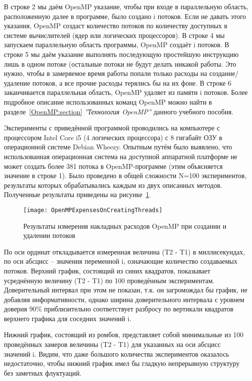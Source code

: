 \inputminted{c++}{listings/OpenMPExampleTimeMeasurement.cpp}

В строке 2 мы даём OpenMP указание, чтобы при входе в параллельную область, расположенную далее в программе, было создано i потоков. Если не давать этого указания, OpenMP создаст количество потоков по количеству доступных в системе вычислителей (ядер или логических процессоров). В строке 4 мы запускаем параллельную область программы, OpenMP создаёт i потоков. В строке 5 мы даём указание выполнять последующую простейшую инструкцию лишь в одном потоке (остальные потоки не будут делать никакой работы. Это нужно, чтобы в замеряемое время работы попали только расходы на создание/удаление потоков, а все прочие расходы терялись бы на их фоне. В строке 6 заканчивается параллельная область, OpenMP удаляет из памяти i потоков. Более подробное описание использованных команд OpenMP можно найти в разделе~\ref{OpenMP:section} \textit{''Технология OpenMP''} данного учебного  пособия.

Эксперименты с приведённой программой проводились на компьютере с процессором Intel Core i5 (4 логических процессора) с 8 гигабайт ОЗУ в операционной системе Debian Wheezy. Опытным путём было выявлено, что использованная операционная система на доступной аппаратной платформе не может создать более 381 потока в OpenMP-программе (этим объясняется значение в строке 1). Было проведено в общей сложности N=100 экспериментов, результаты которых обрабатывались каждым из двух описанных методов. Полученные результаты приведены на рисунке~\ref{OpenMPExpensesOnCreatingThreads:image}.

\begin{figure}[H]
    \texttt{[image: OpenMPExpensesOnCreatingThreads]}
    \caption{Результаты измерения накладных расходов OpenMP при создании и удалении потоков}
    \label{OpenMPExpensesOnCreatingThreads:image}
\end{figure} 

По оси ординат откладывается измеренная величина (T2 - T1) в миллисекундах, по оси абсцисс – значения переменной i, означающие количество создаваемых потоков. Верхний график, состоящий из синих квадратов, показывает усреднённую величину (T2 - T1) по 100 проведённым экспериментам. Доверительный интервал при этом не показан, т.к. он загромождал бы график, не добавляя информативности, однако ширина доверительного интервала с уровнем доверия 90\% приблизительно соответствует разбросу по вертикали квадратов верхнего графика для соседних значений i. 

Нижний график, состоящий из ромбов, представляет собой минимальные из 100 проведённых замеров величины (T2 -  T1) для указанных на оси абсцисс значений i. Видим, что даже большого количества экспериментов оказалось недостаточно, чтобы нижний график имел бы гладкую непрерывную структуру без заметных флуктуаций.
